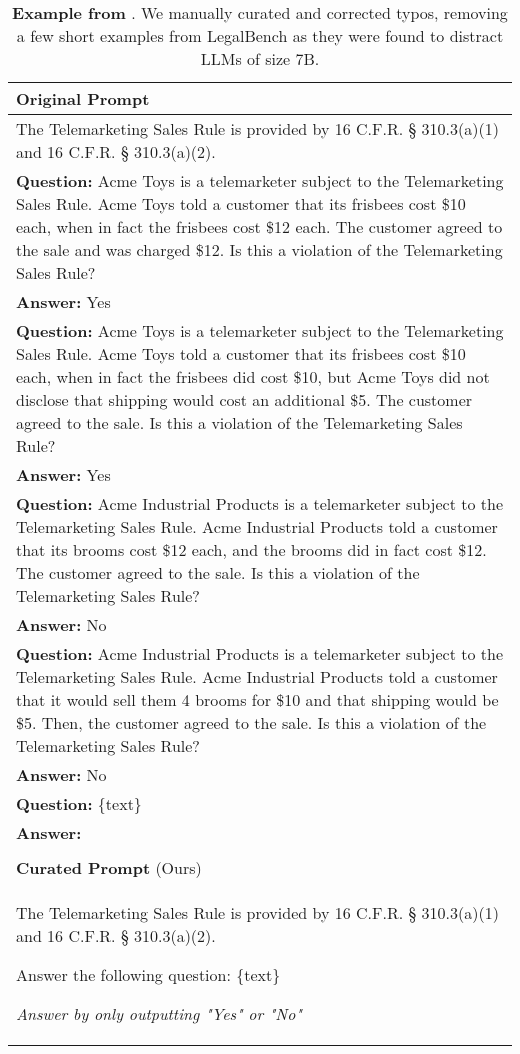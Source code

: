 \begin{table}[ht]
    \scriptsize
    \centering
    \begin{tabular}{p{7cm}}
    \toprule              
    \textbf{Original Prompt} \\
    \midrule
    The Telemarketing Sales Rule is provided by 16 C.F.R. § 310.3(a)(1) and 16 C.F.R. § 310.3(a)(2).
    
\\\textbf{Question:} Acme Toys is a telemarketer subject to the Telemarketing Sales Rule. Acme Toys told a customer that its frisbees cost \$10 each, when in fact the frisbees cost \$12 each. The customer agreed to the sale and was charged \$12. Is this a violation of the Telemarketing Sales Rule?
\\\textbf{Answer:} Yes

\\\textbf{Question:} Acme Toys is a telemarketer subject to the Telemarketing Sales Rule. Acme Toys told a customer that its frisbees cost \$10 each, when in fact the frisbees did cost \$10, but Acme Toys did not disclose that shipping would cost an additional \$5. The customer agreed to the sale. Is this a violation of the Telemarketing Sales Rule?
\\\textbf{Answer:} Yes

\\\textbf{Question:} Acme Industrial Products is a telemarketer subject to the Telemarketing Sales Rule. Acme Industrial Products told a customer that its brooms cost \$12 each, and the brooms did in fact cost \$12. The customer agreed to the sale. Is this a violation of the Telemarketing Sales Rule?
\\\textbf{Answer:} No

\\\textbf{Question:} Acme Industrial Products is a telemarketer subject to the Telemarketing Sales Rule. Acme Industrial Products told a customer that it would sell them 4 brooms for \$10 and that shipping would be \$5. Then, the customer agreed to the sale. Is this a violation of the Telemarketing Sales Rule?
\\\textbf{Answer:} No

\\\textbf{Question:}  \{{text\}}
\\\textbf{Answer:}\\
\\\hline           
\textbf{Curated Prompt} (Ours) \\\hline 

The Telemarketing Sales Rule is provided by 16 C.F.R. § 310.3(a)(1) and 16 C.F.R. § 310.3(a)(2).

Answer the following question: \{text\}

\textit{Answer by only outputting "Yes" or "No"} \\
\bottomrule
\end{tabular}
    \caption{\textbf{Example from \legalbench{}}. We manually curated and corrected typos, removing a few short examples from LegalBench as they were found to distract LLMs of size 7B.\vspace{-.5cm}}
    \label{tab:legalbench}
\end{table} 


